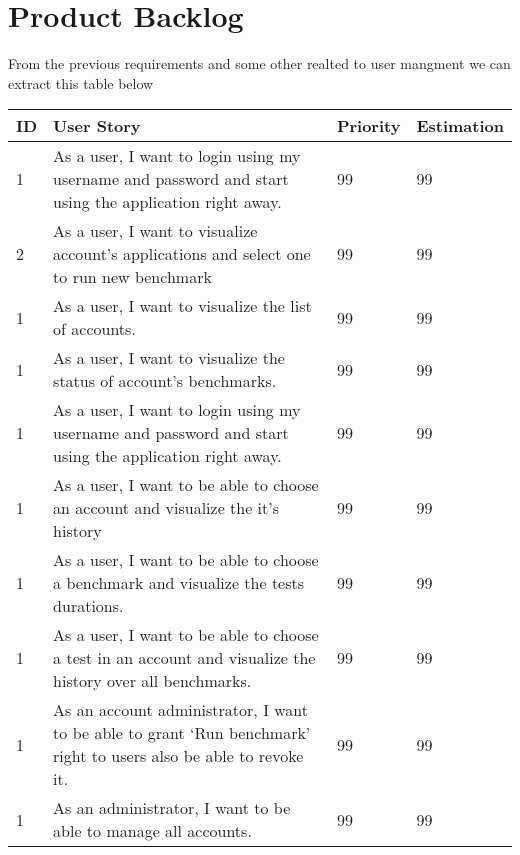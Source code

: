 \section{Product Backlog}
From the previous requirements and some other realted to user mangment we can
extract this table below
\begin{center}
  \begin{tabular}{ | p{1cm}  | p{9cm}  | p{2cm} | p{2cm}| }
    \hline

    ID & User Story                                                                                                        & Priority        & Estimation\\ \hline

    1 & As a user, I want to login using my username and password and start using the application right away.              & 99              & 99        \\ \hline
    2 & As a user, I want to visualize account’s applications and select one to run new benchmark                          & 99              & 99        \\ \hline
    1 & As a user, I want to visualize the list of accounts.                                                               & 99              & 99        \\ \hline
    1 & As a user, I want to visualize the status of account’s benchmarks.                                                 & 99              & 99        \\ \hline
    1 & As a user, I want to login using my username and password and start using the application right away.              & 99              & 99        \\ \hline
    1 & As a user, I want to be able to choose an account and visualize the it’s history                                   & 99              & 99        \\ \hline
    1 & As a user, I want to be able to choose a benchmark and visualize the tests durations.                              & 99              & 99        \\ \hline
    1 & As a user, I want to be able to choose a test in an account and visualize the history over all benchmarks.         & 99              & 99        \\ \hline
    1 & As an account administrator, I want to be able to grant ‘Run benchmark’  right to users also be able to revoke it. & 99              & 99        \\ \hline
    1 & As an administrator, I want to be able to manage all accounts.                                                     & 99              & 99        \\ \hline

    \hline
  \end{tabular}
\end{center}
